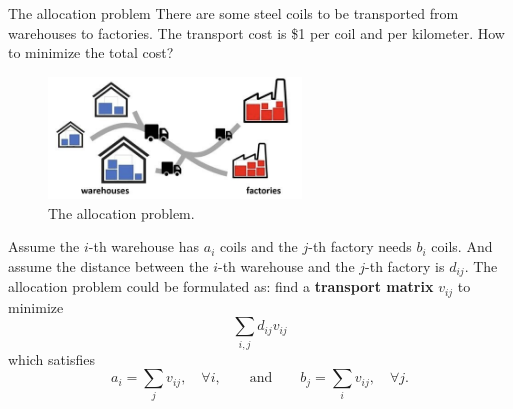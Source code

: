 \begin{frame}{The allocation problem}
    \footnotesize
    There are some steel coils to be transported from warehouses to factories.
    The transport cost is \$1 per coil and per kilometer.
    How to minimize the total cost?

    \begin{figure}
        \captionsetup{font=scriptsize}
        \centering
        \includegraphics[width=0.6\textwidth]{png/SteelTransport.jpg}
        \caption{The allocation problem.}
    \end{figure}

    \pause\vspace{-.5em}
    Assume the $i$-th warehouse has $a_i$ coils and the $j$-th factory
    needs $b_i$ coils. And assume the distance between the $i$-th warehouse
    and the $j$-th factory is $d_{ij}$. The allocation problem could be 
    formulated as: find a \textbf{transport matrix} $v_{ij}$ to minimize
    \begin{equation}
        \sum_{i,j} d_{ij}v_{ij}
    \end{equation}
    which satisfies
    \begin{equation}
        a_i=\sum_{j} v_{ij},\quad \forall i,
        \qquad \text{and} \qquad 
        b_j=\sum_{i} v_{ij},\quad \forall j.
    \end{equation}
\end{frame}